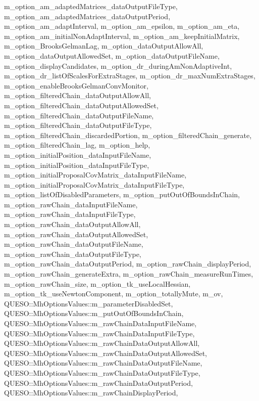 m\-\_\-option\-\_\-am\-\_\-adapted\-Matrices\-\_\-data\-Output\-File\-Type, m\-\_\-option\-\_\-am\-\_\-adapted\-Matrices\-\_\-data\-Output\-Period, m\-\_\-option\-\_\-am\-\_\-adapt\-Interval, m\-\_\-option\-\_\-am\-\_\-epsilon, m\-\_\-option\-\_\-am\-\_\-eta, m\-\_\-option\-\_\-am\-\_\-initial\-Non\-Adapt\-Interval, m\-\_\-option\-\_\-am\-\_\-keep\-Initial\-Matrix, m\-\_\-option\-\_\-\-Brooks\-Gelman\-Lag, m\-\_\-option\-\_\-data\-Output\-Allow\-All, m\-\_\-option\-\_\-data\-Output\-Allowed\-Set, m\-\_\-option\-\_\-data\-Output\-File\-Name, m\-\_\-option\-\_\-display\-Candidates, m\-\_\-option\-\_\-dr\-\_\-during\-Am\-Non\-Adaptive\-Int, m\-\_\-option\-\_\-dr\-\_\-list\-Of\-Scales\-For\-Extra\-Stages, m\-\_\-option\-\_\-dr\-\_\-max\-Num\-Extra\-Stages, m\-\_\-option\-\_\-enable\-Brooks\-Gelman\-Conv\-Monitor, m\-\_\-option\-\_\-filtered\-Chain\-\_\-data\-Output\-Allow\-All, m\-\_\-option\-\_\-filtered\-Chain\-\_\-data\-Output\-Allowed\-Set, m\-\_\-option\-\_\-filtered\-Chain\-\_\-data\-Output\-File\-Name, m\-\_\-option\-\_\-filtered\-Chain\-\_\-data\-Output\-File\-Type, m\-\_\-option\-\_\-filtered\-Chain\-\_\-discarded\-Portion, m\-\_\-option\-\_\-filtered\-Chain\-\_\-generate, m\-\_\-option\-\_\-filtered\-Chain\-\_\-lag, m\-\_\-option\-\_\-help, m\-\_\-option\-\_\-initial\-Position\-\_\-data\-Input\-File\-Name, m\-\_\-option\-\_\-initial\-Position\-\_\-data\-Input\-File\-Type, m\-\_\-option\-\_\-initial\-Proposal\-Cov\-Matrix\-\_\-data\-Input\-File\-Name, m\-\_\-option\-\_\-initial\-Proposal\-Cov\-Matrix\-\_\-data\-Input\-File\-Type, m\-\_\-option\-\_\-list\-Of\-Disabled\-Parameters, m\-\_\-option\-\_\-put\-Out\-Of\-Bounds\-In\-Chain, m\-\_\-option\-\_\-raw\-Chain\-\_\-data\-Input\-File\-Name, m\-\_\-option\-\_\-raw\-Chain\-\_\-data\-Input\-File\-Type, m\-\_\-option\-\_\-raw\-Chain\-\_\-data\-Output\-Allow\-All, m\-\_\-option\-\_\-raw\-Chain\-\_\-data\-Output\-Allowed\-Set, m\-\_\-option\-\_\-raw\-Chain\-\_\-data\-Output\-File\-Name, m\-\_\-option\-\_\-raw\-Chain\-\_\-data\-Output\-File\-Type, m\-\_\-option\-\_\-raw\-Chain\-\_\-data\-Output\-Period, m\-\_\-option\-\_\-raw\-Chain\-\_\-display\-Period, m\-\_\-option\-\_\-raw\-Chain\-\_\-generate\-Extra, m\-\_\-option\-\_\-raw\-Chain\-\_\-measure\-Run\-Times, m\-\_\-option\-\_\-raw\-Chain\-\_\-size, m\-\_\-option\-\_\-tk\-\_\-use\-Local\-Hessian, m\-\_\-option\-\_\-tk\-\_\-use\-Newton\-Component, m\-\_\-option\-\_\-totally\-Mute, m\-\_\-ov, Q\-U\-E\-S\-O\-::\-Mh\-Options\-Values\-::m\-\_\-parameter\-Disabled\-Set, Q\-U\-E\-S\-O\-::\-Mh\-Options\-Values\-::m\-\_\-put\-Out\-Of\-Bounds\-In\-Chain, Q\-U\-E\-S\-O\-::\-Mh\-Options\-Values\-::m\-\_\-raw\-Chain\-Data\-Input\-File\-Name, Q\-U\-E\-S\-O\-::\-Mh\-Options\-Values\-::m\-\_\-raw\-Chain\-Data\-Input\-File\-Type, Q\-U\-E\-S\-O\-::\-Mh\-Options\-Values\-::m\-\_\-raw\-Chain\-Data\-Output\-Allow\-All, Q\-U\-E\-S\-O\-::\-Mh\-Options\-Values\-::m\-\_\-raw\-Chain\-Data\-Output\-Allowed\-Set, Q\-U\-E\-S\-O\-::\-Mh\-Options\-Values\-::m\-\_\-raw\-Chain\-Data\-Output\-File\-Name, Q\-U\-E\-S\-O\-::\-Mh\-Options\-Values\-::m\-\_\-raw\-Chain\-Data\-Output\-File\-Type, Q\-U\-E\-S\-O\-::\-Mh\-Options\-Values\-::m\-\_\-raw\-Chain\-Data\-Output\-Period, Q\-U\-E\-S\-O\-::\-Mh\-Options\-Values\-::m\-\_\-raw\-Chain\-Display\-Period, 